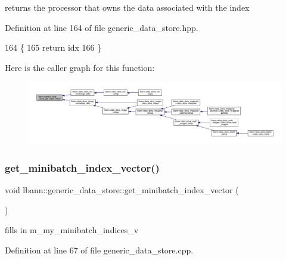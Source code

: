 returns the processor that owns the data associated with the index 

Definition at line 164 of file generic\+\_\+data\+\_\+store.\+hpp.


\begin{DoxyCode}
164                                \{
165     \textcolor{keywordflow}{return} idx %
166   \}
\end{DoxyCode}
Here is the caller graph for this function\+:\nopagebreak
\begin{figure}[H]
\begin{center}
\leavevmode
\includegraphics[width=350pt]{classlbann_1_1generic__data__store_ad0de5ac2cdcf3f692acb252a019a2aed_icgraph}
\end{center}
\end{figure}
\mbox{\label{classlbann_1_1generic__data__store_ab861db5f81e45a6063b8922a331dd007}} 
\subsubsection{\texorpdfstring{get\+\_\+minibatch\+\_\+index\+\_\+vector()}{get\_minibatch\_index\_vector()}}
{\footnotesize\ttfamily void lbann\+::generic\+\_\+data\+\_\+store\+::get\+\_\+minibatch\+\_\+index\+\_\+vector (\begin{DoxyParamCaption}{ }\end{DoxyParamCaption})\hspace{0.3cm}{\ttfamily [protected]}}



fills in m\+\_\+my\+\_\+minibatch\+\_\+indices\+\_\+v 



Definition at line 67 of file generic\+\_\+data\+\_\+store.\+cpp.


